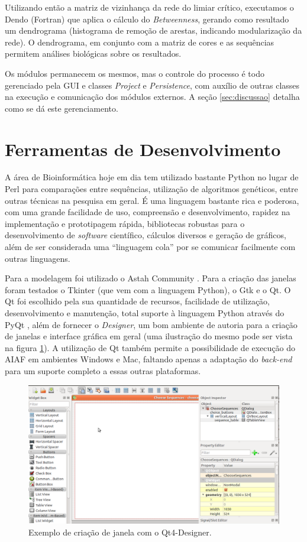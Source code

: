 Utilizando então a matriz de vizinhança da rede do limiar crítico, executamos o Dendo (Fortran) que aplica o cálculo do \textit{Betweenness}, gerando como
resultado um dendrograma (histograma de remoção de arestas, indicando modularização da rede). O dendrograma, em conjunto com a matriz de cores e as sequências
permitem análises biológicas sobre os resultados.

Os módulos permanecem os mesmos, mas o controle do processo é todo gerenciado pela GUI e classes \textit{Project} e \textit{Persistence}, com auxílio de
outras classes na execução e comunicação dos módulos externos. A seção \ref{sec:discussao} detalha como se dá este gerenciamento.

\section{Ferramentas de Desenvolvimento} \label{sec:ferramentas}

A área de Bioinformática hoje em dia tem utilizado bastante Python \cite{python} no lugar de Perl para comparações entre sequências, utilização de algoritmos
genéticos, entre outras técnicas na pesquisa em geral. É uma linguagem bastante rica e poderosa, com uma grande facilidade de uso, compreensão e
desenvolvimento, rapidez na implementação e prototipagem rápida, bibliotecas robustas para o desenvolvimento de \textit{software} científico, cálculos
diversos e geração de gráficos, além de ser considerada uma ``linguagem cola'' por se comunicar facilmente com outras linguagens.

Para a modelagem foi utilizado o Astah Community \cite{astah}. Para a criação das janelas foram testados o Tkinter (que vem com a linguagem Python), o Gtk
e o Qt. O Qt foi escolhido pela sua quantidade de recursos, facilidade de utilização, desenvolvimento e manutenção, total suporte à linguagem Python através
do PyQt \cite{pyqt}, além de fornecer o \textit{Designer}, um bom ambiente de autoria para a criação de janelas e interface gráfica em geral (uma ilustração
do mesmo pode ser vista na figura \ref{fig:designer}). A utilização de Qt também permite a possibilidade de execução do AIAF em ambientes Windows e Mac,
faltando apenas a adaptação do \textit{back-end} para um suporte completo a essas outras plataformas.

\begin{figure}
\centering
\includegraphics[scale=0.38]{designer}
\caption{Exemplo de criação de janela com o Qt4-Designer.}
\label{fig:designer}
\end{figure}

